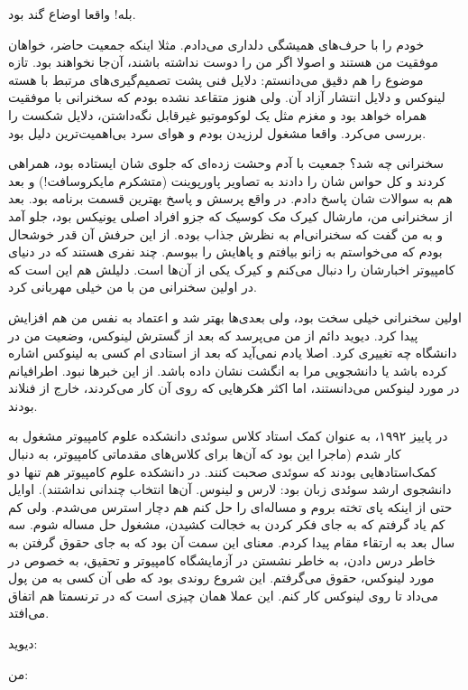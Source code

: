 بله! واقعا اوضاع گند بود.

خودم را با حرف‌های همیشگی دلداری می‌دادم. مثلا اینکه جمعیت حاضر، خواهان
موفقیت من هستند و اصولا اگر من را دوست نداشته باشند، آن‌جا نخواهند
بود. تازه موضوع را هم دقیق می‌دانستم: دلایل فنی پشت تصمیم‌گیری‌های مرتبط
با هسته لینوکس و دلایل انتشار آزاد آن. ولی هنوز متقاعد نشده بودم که
سخنرانی با موفقیت همراه خواهد بود و مغزم مثل یک لوکوموتیو غیرقابل
نگه‌داشتن، دلایل شکست را بررسی می‌کرد. واقعا مشغول لرزیدن بودم و هوای
سرد بی‌اهمیت‌ترین دلیل بود.

سخنرانی چه شد؟ جمعیت با آدم وحشت زده‌ای که جلوی شان ایستاده بود، همراهی
کردند و کل حواس شان را دادند به تصاویر پاورپوینت (متشکرم مایکروسافت!)
و بعد هم به سوالات شان پاسخ دادم. در واقع پرسش و پاسخ بهترین قسمت
برنامه بود. بعد از سخنرانی من، مارشال کیرک مک کوسیک که جزو افراد اصلی یونیکس  بود، جلو آمد و به من
گفت که سخنرانی‌ام به نظرش جذاب بوده. از این حرفش آن قدر خوشحال بودم که
می‌خواستم به زانو بیافتم و پاهایش را ببوسم. چند نفری هستند که در دنیای
کامپیوتر اخبارشان را دنبال می‌کنم و کیرک یکی از آن‌ها است. دلیلش هم این
است که در اولین سخنرانی من با من خیلی مهربانی کرد.

اولین سخنرانی خیلی سخت بود، ولی بعدی‌ها بهتر شد و اعتماد به نفس من هم
افزایش پیدا کرد. دیوید دائم از من می‌پرسد که بعد از گسترش لینوکس، وضعیت
من در دانشگاه چه تغییری کرد. اصلا یادم نمی‌آید که بعد از استادی ام کسی
به لینوکس اشاره کرده باشد یا دانشجویی مرا به انگشت نشان داده باشد. از
این خبرها نبود. اطرافیانم در مورد لینوکس می‌دانستند، اما اکثر هکرهایی
که روی آن کار می‌کردند، خارج از فنلاند بودند.

در پاییز ۱۹۹۲، به عنوان کمک استاد کلاس سوئدی دانشکده علوم کامپیوتر
مشغول به کار شدم (ماجرا این بود که آن‌‌ها برای کلاس‌های مقدماتی کامپیوتر،
به دنبال کمک‌استادهایی بودند که سوئدی صحبت کنند. در دانشکده علوم
کامپیوتر هم تنها دو دانشجوی ارشد سوئدی زبان بود: لارس و لینوس. آن‌ها
انتخاب چندانی نداشتند). اوایل حتی از اینکه پای تخته بروم و مساله‌ای را
حل کنم هم دچار استرس می‌شدم. ولی کم کم یاد گرفتم که به جای فکر کردن به
خجالت کشیدن، مشغول حل مساله شوم. سه سال بعد به 
ارتقاء مقام پیدا کردم. معنای این سمت آن بود که به جای حقوق گرفتن به
خاطر درس دادن، به خاطر نشستن در آزمایشگاه کامپیوتر و تحقیق، به خصوص در
مورد لینوکس، حقوق می‌گرفتم. این شروع روندی بود که طی آن کسی به من پول
می‌داد تا روی لینوکس کار کنم. این عملا همان چیزی است که در ترنسمتا هم
اتفاق می‌افتد.

دیوید: 

من: 


